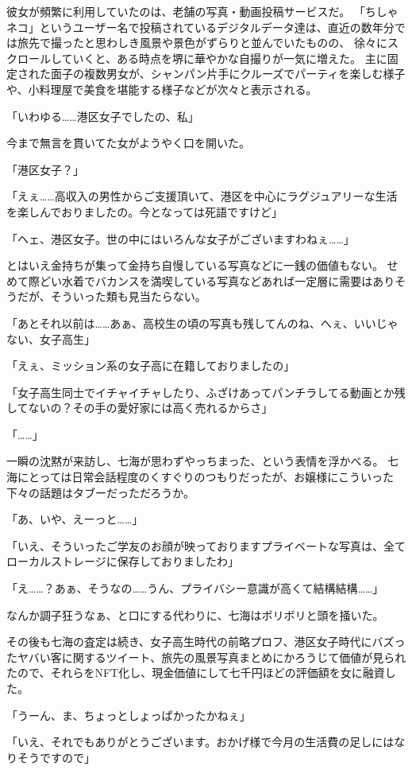 彼女が頻繁に利用していたのは、老舗の写真・動画投稿サービスだ。
「ちしゃネコ」というユーザー名で投稿されているデジタルデータ達は、直近の数年分では旅先で撮ったと思わしき風景や景色がずらりと並んでいたものの、
徐々にスクロールしていくと、ある時点を堺に華やかな自撮りが一気に増えた。
主に固定された面子の複数男女が、シャンパン片手にクルーズでパーティを楽しむ様子や、小料理屋で美食を堪能する様子などが次々と表示される。

「いわゆる……港区女子でしたの、私」

今まで無言を貫いてた女がようやく口を開いた。

「港区女子？」

「えぇ……高収入の男性からご支援頂いて、港区を中心にラグジュアリーな生活を楽しんでおりましたの。今となっては死語ですけど」

「ヘェ、港区女子。世の中にはいろんな女子がございますわねぇ……」

とはいえ金持ちが集って金持ち自慢している写真などに一銭の価値もない。
せめて際どい水着でバカンスを満喫している写真などあれば一定層に需要はありそうだが、そういった類も見当たらない。

「あとそれ以前は……あぁ、高校生の頃の写真も残してんのね、へぇ、いいじゃない、女子高生」

「えぇ、ミッション系の女子高に在籍しておりましたの」

「女子高生同士でイチャイチャしたり、ふざけあってパンチラしてる動画とか残してないの？その手の愛好家には高く売れるからさ」

「……」

一瞬の沈黙が来訪し、七海が思わずやっちまった、という表情を浮かべる。
七海にとっては日常会話程度のくすぐりのつもりだったが、お嬢様にこういった下々の話題はタブーだっただろうか。

「あ、いや、えーっと……」

「いえ、そういったご学友のお顔が映っておりますプライベートな写真は、全てローカルストレージに保存しておりましたわ」

「え……？あぁ、そうなの……うん、プライバシー意識が高くて結構結構……」

なんか調子狂うなぁ、と口にする代わりに、七海はボリボリと頭を掻いた。

その後も七海の査定は続き、女子高生時代の前略プロフ、港区女子時代にバズったヤバい客に関するツイート、旅先の風景写真まとめにかろうじて価値が見られたので、それらをNFT化し、現金価値にして七千円ほどの評価額を女に融資した。

「うーん、ま、ちょっとしょっぱかったかねぇ」

「いえ、それでもありがとうございます。おかげ様で今月の生活費の足しにはなりそうですので」

